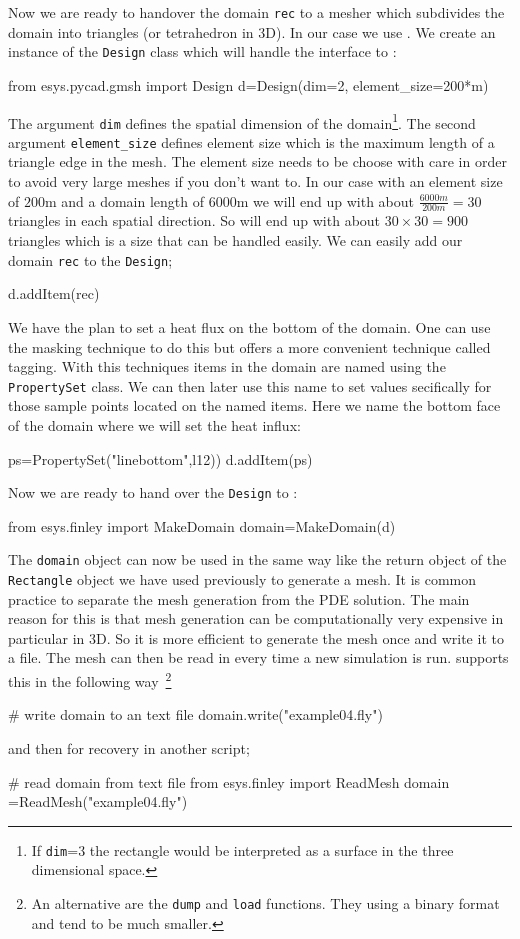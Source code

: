 Now we are ready to handover the domain \verb|rec| to a mesher which subdivides the domain into triangles (or tetrahedron in 3D). In our case we use \gmsh. We create 
an instance of the \verb|Design| class which will handle the interface to \gmsh: 
\begin{python}
from esys.pycad.gmsh import Design 
d=Design(dim=2, element_size=200*m)
\end{python}
The argument \verb|dim| defines the spatial dimension of the domain\footnote{If \texttt{dim}=3 the rectangle would be interpreted as a surface in the three dimensional space.}. The second argument \verb|element_size| defines element size which is the maximum length of a triangle edge in the mesh. The element size needs to be choose with care in order to avoid very large meshes if you don't want to. In our case with an element size of $200$m 
and a domain length of $6000$m we will end up with about $\frac{6000m}{200m}=30$ triangles in each spatial direction. So will end up with about $30 \times 30 = 900$ triangles which is a size that can be handled easily.
We can easily add our domain \verb|rec| to the \verb|Design|;
\begin{python}
d.addItem(rec)
\end{python}
We have the plan to set a heat flux on the bottom of the domain. One can use the masking technique to do this
but \pycad offers a more convenient technique called tagging. With this techniques items in the domain are
named using the \verb|PropertySet| class. We can then later use this name to set values secifically for
those sample points located on the named items. Here we name the bottom face of the 
domain where we will set the heat influx:
\begin{python}
ps=PropertySet("linebottom",l12))
d.addItem(ps)
\end{python}
Now we are ready to hand over the \verb|Design| to \FINLEY:
\begin{python}
from esys.finley import MakeDomain
domain=MakeDomain(d)
\end{python}
The \verb|domain| object can now be used in the same way like the return object of the \verb|Rectangle| 
object we have used previously to generate a mesh. It is common practice to separate the 
mesh generation from the PDE solution. The main reason for this is that mesh generation can be computationally very expensive in particular in 3D. So it is more efficient to generate the mesh once and write it to a file. The mesh
can then be read in every time a new simulation is run. \FINLEY supports this in the following 
way~\footnote{An alternative are the \texttt{dump} and \texttt{load} functions. They using a binary format and tend to be much smaller.}
\begin{python}
# write domain to an text file
domain.write("example04.fly")
\end{python}
and then for recovery in another script;
\begin{python}
# read domain from text file
from esys.finley import ReadMesh
domain =ReadMesh("example04.fly")
\end{python}


